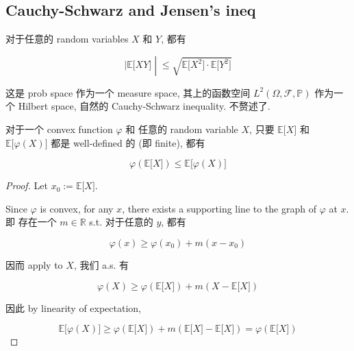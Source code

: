 \subsection{Cauchy-Schwarz and Jensen's ineq}\label{cauchy-schwarz-and-jensens-ineq}

\begin{theorem}{}

对于任意的 random variables \(\mathit{X}\) 和 \(\mathit{Y}\), 都有

\[\left. |\mathbb{E}\lbrack\mathit{X}\mathit{Y}\rbrack \middle| \leq \sqrt{\mathbb{E}\lbrack\mathit{X}^{2}\rbrack \cdot \mathbb{E}\lbrack\mathit{Y}^{2}\rbrack} \right.\]

\end{theorem}

这是 prob space 作为一个 measure space, 其上的函数空间 \(\mathit{L}^{2}(\Omega,\mathcal{F},\mathbb{P})\) 作为一个 Hilbert space, 自然的 Cauchy-Schwarz inequality. 不赘述了.

\begin{theorem}{}

对于一个 convex function \(\mathit{\varphi}\) 和 任意的 random variable \(\mathit{X}\), 只要 \(\mathbb{E}\lbrack\mathit{X}\rbrack\) 和 \(\mathbb{E}\lbrack\mathit{\varphi}(\mathit{X})\rbrack\) 都是 well-defined 的 (即 finite), 都有

\[\mathit{\varphi}(\mathbb{E}\lbrack\mathit{X}\rbrack) \leq \mathbb{E}\lbrack\mathit{\varphi}(\mathit{X})\rbrack\]

\end{theorem}

\begin{proof}

Let \(\mathit{x}_{0} := \mathbb{E}\lbrack\mathit{X}\rbrack\).

Since \(\mathit{\varphi}\) is convex, for any \(\mathit{x}\), there exists a supporting line to the graph of \(\mathit{\varphi}\) at \(\mathit{x}\). 即 存在一个 \(\mathit{m} \in \mathbb{R}\) s.t. 对于任意的 \(\mathit{y}\), 都有

\[\mathit{\varphi}(\mathit{x}) \geq \mathit{\varphi}\left( \mathit{x}_{0} \right) + \mathit{m}\left( {\mathit{x} - \mathit{x}_{0}} \right)\]

因而 apply to \(\mathit{X}\), 我们 a.s. 有

\[\mathit{\varphi}(\mathit{X}) \geq \mathit{\varphi}(\mathbb{E}\lbrack\mathit{X}\rbrack) + \mathit{m}(\mathit{X} - \mathbb{E}\lbrack\mathit{X}\rbrack)\]

因此 by linearity of expectation,

\[\mathbb{E}\lbrack\mathit{\varphi}(\mathit{X})\rbrack \geq \mathit{\varphi}(\mathbb{E}\lbrack\mathit{X}\rbrack) + \mathit{m}(\mathbb{E}\lbrack\mathit{X}\rbrack - \mathbb{E}\lbrack\mathit{X}\rbrack) = \mathit{\varphi}(\mathbb{E}\lbrack\mathit{X}\rbrack)\]

\end{proof}

